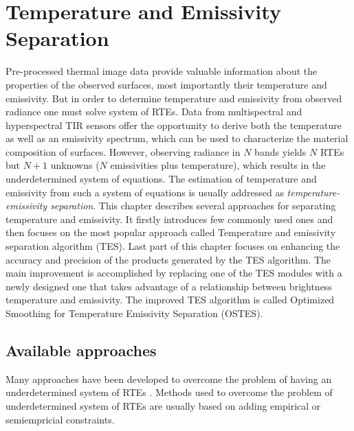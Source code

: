 \chapter{Temperature and Emissivity Separation}
\label{chap:TES}

Pre-processed thermal image data provide valuable information about the properties of the observed surfaces, most importantly their temperature and emissivity. But in order to determine temperature and emissivity from observed radiance one must solve system of RTEs. Data from multispectral and hyperspectral TIR sensors offer the opportunity to derive both the temperature as well as an emissivity spectrum, which can be used to characterize the material composition of surfaces. However, observing radiance in $N$ bands yields $N$ RTEs but $N+1$ unknowns ($N$ emissivities plus temperature), which results in the underdetermined system of equations. The estimation of temperature and emissivity from such a system of equations is usually addressed as \textit{temperature-emissivity separation}. This chapter describes several approaches for separating temperature and emissivity. It firstly introduces few commonly used ones and then focuses on the most popular approach called Temperature and emissivity separation algorithm (TES). Last part of this chapter focuses on enhancing the accuracy and precision of the products generated by the TES algorithm. The main improvement is accomplished by replacing one of the TES modules with a newly designed one that takes advantage of a relationship between brightness temperature and emissivity. The improved TES algorithm is called Optimized Smoothing for Temperature Emissivity Separation (OSTES).

\section{Available approaches}

Many approaches have been developed to overcome the problem of having an underdetermined system of RTEs \cite{LT13}. Methods used to overcome the problem of underdetermined system of RTEs are usually based on adding empirical or semiempricial constraints. 

